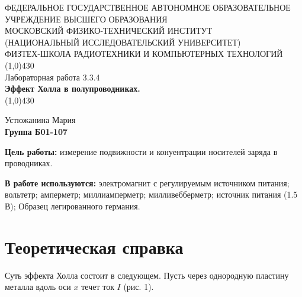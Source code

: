 \documentclass[11pt]{article}
\begin{document}
\begin{titlepage}
\begin{center}
\large{\small ФЕДЕРАЛЬНОЕ ГОСУДАРСТВЕННОЕ АВТОНОМНОЕ ОБРАЗОВАТЕЛЬНОЕ\\ УЧРЕЖДЕНИЕ ВЫСШЕГО ОБРАЗОВАНИЯ\\ МОСКОВСКИЙ ФИЗИКО-ТЕХНИЧЕСКИЙ ИНСТИТУТ\\ (НАЦИОНАЛЬНЫЙ ИССЛЕДОВАТЕЛЬСКИЙ УНИВЕРСИТЕТ)\\ ФИЗТЕХ-ШКОЛА РАДИОТЕХНИКИ И КОМПЬЮТЕРНЫХ ТЕХНОЛОГИЙ}
\vfill
\line(1,0){430}\\[1mm]
\huge{Лабораторная работа 3.3.4}\\
\huge\textbf{Эффект Холла в полупроводниках.}\\
\line(1,0){430}\\[1mm]
\vfill
\begin{flushright}
\normalsize{Устюжанина Мария}\\
\normalsize{\textbf{Группа Б01-107}}\\
\end{flushright}
\end{center}
\end{titlepage}

\par \textbf{Цель работы:} измерение подвижности и конуентрации носителей заряда в проводниках.

\par \textbf{В работе используются:} электромагнит с регулируемым источником питания; вольтетр; амперметр; миллиамперметр; милливебберметр; источник питания (1.5 В); Образец легированного германия.



\section{Теоретическая справка}
    Суть эффекта Холла состоит в следующем. Пусть через однородную пластину металла вдоль оси $x$ течет ток $I$ (рис. 1).
    
\end{document}
